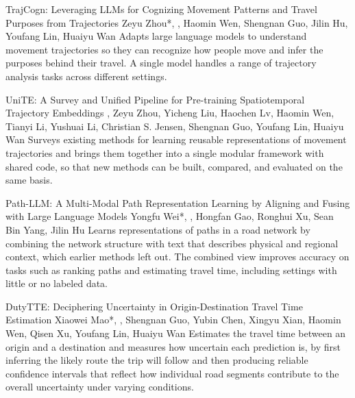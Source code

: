 {TrajCogn: Leveraging LLMs for Cognizing Movement Patterns and Travel Purposes from Trajectories}
{Zeyu Zhou*, \me*, Haomin Wen, Shengnan Guo, Jilin Hu, Youfang Lin, Huaiyu Wan}
{Adapts large language models to understand movement trajectories so they can recognize how people move and infer the purposes behind their travel. A single model handles a range of trajectory analysis tasks across different settings.}

{UniTE: A Survey and Unified Pipeline for Pre-training Spatiotemporal Trajectory Embeddings}
{\me, Zeyu Zhou, Yicheng Liu, Haochen Lv, Haomin Wen, Tianyi Li, Yushuai Li, Christian S. Jensen, Shengnan Guo, Youfang Lin, Huaiyu Wan}
{Surveys existing methods for learning reusable representations of movement trajectories and brings them together into a single modular framework with shared code, so that new methods can be built, compared, and evaluated on the same basis.}

{Path-LLM: A Multi-Modal Path Representation Learning by Aligning and Fusing with Large Language Models}
{Yongfu Wei*, \me*, Hongfan Gao, Ronghui Xu, Sean Bin Yang, Jilin Hu}
{Learns representations of paths in a road network by combining the network structure with text that describes physical and regional context, which earlier methods left out. The combined view improves accuracy on tasks such as ranking paths and estimating travel time, including settings with little or no labeled data.}

{DutyTTE: Deciphering Uncertainty in Origin-Destination Travel Time Estimation}
{Xiaowei Mao*, \me*, Shengnan Guo, Yubin Chen, Xingyu Xian, Haomin Wen, Qisen Xu, Youfang Lin, Huaiyu Wan}
{Estimates the travel time between an origin and a destination and measures how uncertain each prediction is, by first inferring the likely route the trip will follow and then producing reliable confidence intervals that reflect how individual road segments contribute to the overall uncertainty under varying conditions.}

